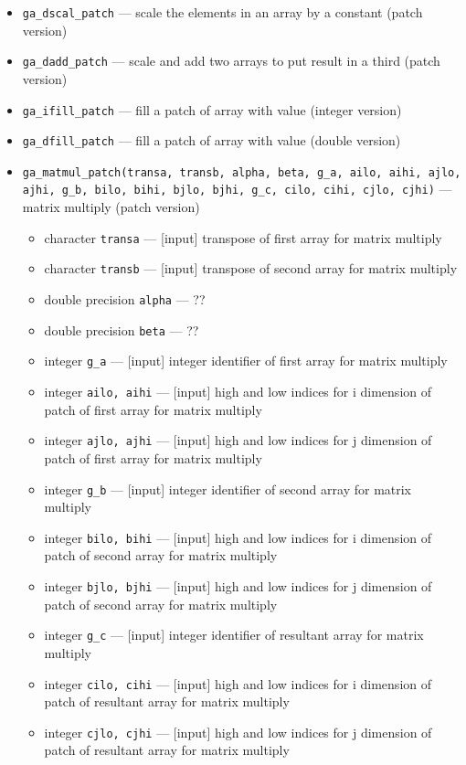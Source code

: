 \begin{itemize}
\item {\tt ga\_dscal\_patch} --- scale the elements in an array by a
  constant (patch version)
\item {\tt ga\_dadd\_patch} --- scale and add two arrays to put result
  in a third (patch version)
\item {\tt ga\_ifill\_patch} --- fill a patch of array with value
  (integer version)
\item {\tt ga\_dfill\_patch} --- fill a patch of array with value
  (double version)
\item {\tt ga\_matmul\_patch(transa, transb, alpha, beta, g\_a, ailo, aihi,
ajlo, ajhi, g\_b, bilo, bihi, bjlo, bjhi, g\_c, cilo, cihi,
cjlo, cjhi)} --- matrix multiply (patch version)
\begin{itemize}
\item      character {\tt transa}        --- [input] transpose of first array for matrix multiply
\item      character {\tt transb}        --- [input] transpose of second array for matrix multiply
\item      double precision {\tt alpha}  ---  ??
\item      double precision {\tt beta}   ---  ??
\item      integer {\tt g\_a}            --- [input] integer identifier of first array for matrix multiply
\item     integer {\tt ailo, aihi}       --- [input] high and low indices for i dimension of
                                               patch of first array for matrix multiply
\item     integer {\tt ajlo, ajhi}       --- [input] high and low indices for j dimension of
                                               patch of first array for matrix multiply
\item      integer {\tt g\_b}            --- [input] integer identifier of second array for matrix multiply
\item     integer {\tt bilo, bihi}       --- [input] high and low indices for i dimension of
                                               patch of second array for matrix multiply
\item     integer {\tt bjlo, bjhi}       --- [input] high and low indices for j dimension of
                                               patch of second array for matrix multiply
\item      integer {\tt g\_c}            --- [input] integer identifier of resultant array for matrix multiply
\item     integer {\tt cilo, cihi}       --- [input] high and low indices for i dimension of
                                               patch of resultant array for matrix multiply
\item     integer {\tt cjlo, cjhi}       --- [input] high and low indices for j dimension of
                                               patch of resultant array for matrix multiply
\end{itemize}



\end{itemize}
